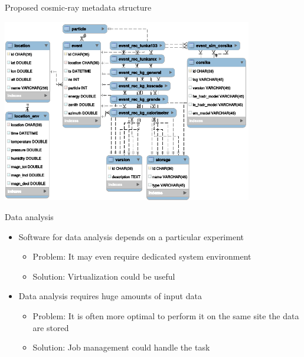 \documentclass[18pt]{beamer}
\newcommand{\itemarrow}{\scriptsize\raise1.25pt\hbox{\textcolor{kit-green100}{$\blacktriangleright$}}}
\newcommand{\concl}[1]{\item[\itemarrow]\textcolor{kit-green100}{#1}}
\begin{document}
\begin{frame}{Proposed cosmic-ray metadata structure}
\vspace{-1.5em}
\begin{center}
\includegraphics[width=0.82\textwidth]{pics/metadata.eps}
\end{center}
\end{frame}

\begin{frame}{Data analysis}
\begin{itemize}
  \item Software for data analysis depends on a particular experiment
  \begin{itemize}
    \item Problem: It may even require dedicated system environment
    \concl{Solution: Virtualization could be useful}
  \end{itemize}
  \item Data analysis requires huge amounts of input data
  \begin{itemize}
    \item Problem: It is often more optimal to perform it on the same site the data are stored
    \concl{Solution: Job management could handle the task}
  \end{itemize}
\end{itemize}
\end{frame}
\end{document}
